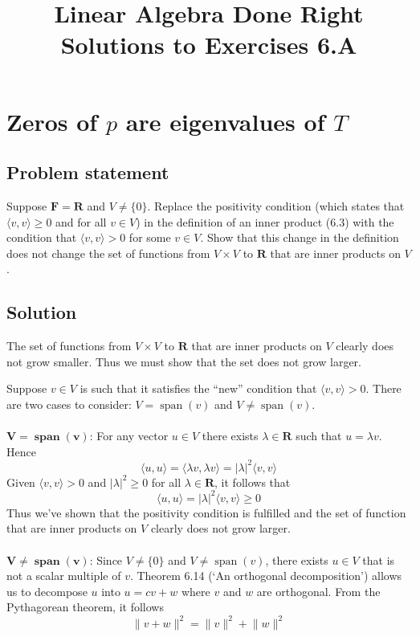 \documentclass{article}
\title{Linear Algebra Done Right\\Solutions to Exercises 6.A}
\author{}
\date{}
\providecommand{\abs}[1]{\lvert#1\rvert} \providecommand{\norm}[1]{\lVert#1\rVert}
\begin{document}
\maketitle

\clearpage

\renewcommand{\thesection}{3}
\section{Zeros of $p$ are eigenvalues of $T$}
\subsection*{Problem statement}
Suppose $\mathbf{F}=\mathbf{R}$ and $V\neq \{0\}$. Replace the positivity condition (which states that $\langle v, v\rangle\geq 0$ and for all $v\in V$) in the definition of an inner product (6.3) with the condition that $\langle v, v\rangle > 0$ for some $v\in V$. Show that this change in the definition does not change the set of functions from $V\times V$ to $\mathbf{R}$ that are inner products on $V$.

\subsection*{Solution}
The set of functions from $V\times V$ to $\mathbf{R}$ that are inner products on $V$ clearly does not grow smaller. Thus we must show that the set does not grow larger.

Suppose $v\in V$ is such that it satisfies the ``new'' condition that $\langle v, v\rangle > 0$. There are two cases to consider: $V=\operatorname{span}(v)$ and $V\neq\operatorname{span}(v)$.
\\
\\
$\mathbf{{V=\operatorname{\textbf{span}}(v)}}$: For any vector $u\in V$ there exists $\lambda\in\mathbf{R}$ such that $u=\lambda v$. Hence 
\[\langle u, u\rangle =\langle \lambda v, \lambda v \rangle = \abs{\lambda}^2\langle v, v\rangle \]
Given $\langle v, v\rangle > 0$ and $|\lambda|^2\geq 0$ for all $\lambda\in\mathbf{R}$, it follows that 
\[\langle u, u\rangle = |\lambda|^2\langle v, v\rangle \geq 0\]
Thus we've shown that the positivity condition is fulfilled and the set of function that are inner products on $V$ clearly does not grow larger.
\\
\\
$\mathbf{V\neq\operatorname{\textbf{span}}(v)}$: Since $V\neq \{0\}$ and $V\neq\operatorname{span}(v)$, there exists $u\in V$ that is not a scalar multiple of $v$. Theorem 6.14 (`An orthogonal decomposition') allows us to decompose $u$ into $u=cv+w$ where $v$ and $w$ are orthogonal. From the Pythagorean theorem, it follows
\[\norm{v+w}^2=\norm{v}^2+\norm{w}^2\]
\end{document}
